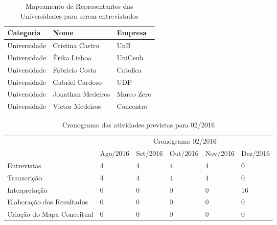 \begin{table}[!htb]
	\centering
	\label{tabela:sugestao_de_universidades_para_entrevista}
	\begin{tabular}{ | p{3cm} | p{8cm} | p{4cm} | }
		\hline
		Categoria & Nome & Empresa \\ \hline
		Universidade & Cristina Castro & UnB \\ \hline
		Universidade & Érika Lisboa & UniCeub \\ \hline
		Universidade & Fabricio Costa & Catolica \\ \hline
		Universidade & Gabriel Cardoso & UDF \\ \hline
		Universidade & Jonathan Medeiros & Marco Zero \\ \hline		
		Universidade & Victor Medeiros & Concentro \\ \hline
	\end{tabular}
	\caption{Mapeamento de Representantes das Universidades para serem entrevistados}
\end{table}

\begin{table}[!htpb]
	\centering
	\begin{small} 
		\begin{tabular}{|p{5cm}|p{2cm}|p{2cm}|p{2cm}|p{2cm}|p{2cm}|} \hline
		 & \multicolumn{5}{c|}{Cronograma 02/2016}\\ \cline{2-6} 
		\raisebox{1.5ex}{Atividade} & Ago/2016 & Set/2016 & Out/2016 & Nov/2016 & Dez/2016 \\ \hline
		Entrevistas   & 4 & 4 & 4 & 4 & 0 \\ \hline
		Transcrição   & 4 & 4 & 4 & 4 & 0 \\ \hline
		Interpretação & 0 & 0 & 0 & 0 & 16 \\ \hline
		Elaboração dos Resultados    & 0 & 0 & 0 & 0 & 0 \\ \hline
		Criação do Mapa Conceitual & 0 & 0 & 0 & 0 & 0 \\ \hline
		\end{tabular} 
	\end{small}
	\caption{Cronograma das atividades previstas para 02/2016}
	\label{t_cronograma}
\end{table} 

